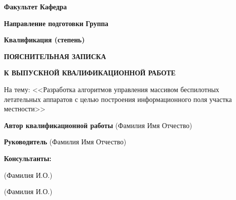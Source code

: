 \begin{titlepage}
\newpage

\begin{onehalfspace}



\noindent\textbf{Факультет}\hfill
\textbf{Кафедра}

\noindent\textbf{Направление подготовки}
\textbf{Группа}

\noindent\textbf{Квалификация (степень)}

\vfill

\begin{center}
    \textbf{ПОЯСНИТЕЛЬНАЯ ЗАПИСКА}
    
    \textbf{К ВЫПУСКНОЙ КВАЛИФИКАЦИОННОЙ РАБОТЕ}

\end{center}

На тему: <<Разработка алгоритмов управления массивом беспилотных
    летательных аппаратов с целью построения информационного
поля участка местности>>

\vfill

\noindent\textbf{Автор квалификационной работы}\textspaceend{/\hspace{2.5cm}}
{\center\vspace{-1.6em}\hspace{9cm}\tiny(Фамилия Имя Отчество)}

\noindent\textbf{Руководитель}\textspaceend{/\hspace{2.5cm}}
{\center\vspace{-1.6em}\hspace{9cm}\tiny(Фамилия Имя Отчество)}

\noindent\textbf{Консультанты:}

\begin{mintemize}

\item {}\textspaceend{/\hspace{2.5cm}}
{\center\vspace{-2em}\hspace{9cm}\tiny(Фамилия И.О.)}

\item {}\textspaceend{/\hspace{2.5cm}}
{\center\vspace{-2em}\hspace{9cm}\tiny(Фамилия И.О.)}


\end{mintemize}
\end{onehalfspace}
\end{titlepage}
